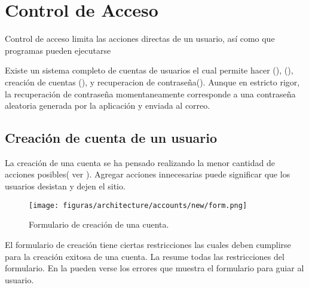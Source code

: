 \section{Control de Acceso}

Control de acceso limita las acciones directas de un usuario, así como que programas pueden ejecutarse \cite{sandhu1994access}
 
Existe un sistema completo de cuentas de usuarios el cual permite hacer \loginCPT(), \logoutCPT(), creación de cuentas (), y recuperacion de contraseña(). Aunque en estricto rigor, la recuperación de contraseña momentaneamente corresponde a una contraseña aleatoria generada por la aplicación y enviada al correo.


\subsection{Creación de cuenta de un usuario}

La creación de una cuenta se ha pensado realizando la menor cantidad de acciones posibles( ver ). Agregar acciones innecesarias puede significar que los usuarios desistan y dejen el sitio\cite{online_goodgui_org}.

\begin{figure}[H]
	\centering
	\texttt{[image: figuras/architecture/accounts/new/form.png]}

	\caption{Formulario de creación de una cuenta.}
	\label{figure:architecture:accounts:new:form}
\end{figure}


El formulario de creación tiene ciertas restricciones las cuales deben cumplirse para la creación exitosa de una cuenta. La  resume todas las restricciones del formulario. En la  pueden verse los errores que muestra el formulario para guiar al usuario.

